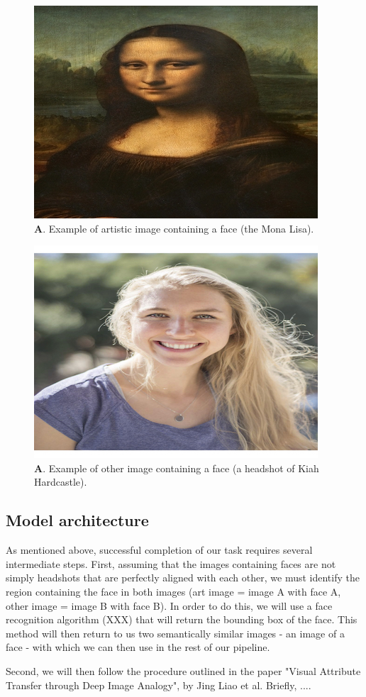 \documentclass{pnastwo2}
\begin{document}
\begin{article}
\begin{figure}
	\begin{center}
		\includegraphics[width=.3\textwidth]{mona_lisa.jpg}
		\caption{{\bfseries A}. Example of artistic image containing a face (the Mona Lisa).} \label{fig:mona}
	\end{center}
\end{figure} 

\begin{figure}
	\begin{center}
		\includegraphics[width=.3\textwidth]{headshot_kiahhardcastle}
		\caption{{\bfseries A}. Example of other image containing a face (a headshot of Kiah Hardcastle).} \label{fig:kiah}
	\end{center}
\end{figure} 

\subsection{Model architecture}

As mentioned above, successful completion of our task requires several intermediate steps. First, assuming that the images containing faces are not simply headshots that are perfectly aligned with each other, we must identify the region containing the face in both images (art image = image A with face A, other image = image B with face B). In order to do this, we will use a face recognition algorithm (XXX) that will return the bounding box of the face. This method will then return to us two semantically similar images - an image of a face - with which we can then use in the rest of our pipeline.

Second, we will then follow the procedure outlined in the paper "Visual Attribute Transfer through Deep Image Analogy", by Jing Liao et al. Briefly, .... 


\end{article}
\end{document}
